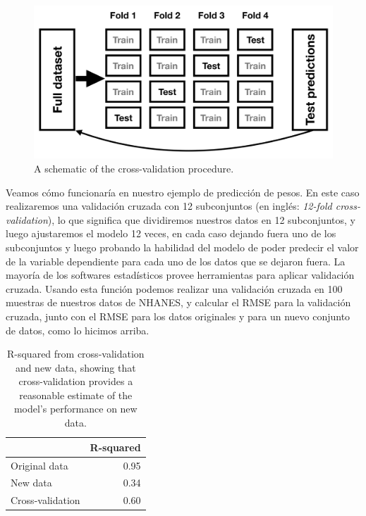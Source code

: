 \documentclass[
  12pt,
]{book}
\theoremstyle{definition}
\theoremstyle{definition}
\theoremstyle{definition}
\theoremstyle{remark}
\begin{document}
\begin{figure}
\includegraphics[width=45.74in,height=0.3\textheight]{images/crossvalidation} \caption{A schematic of the  cross-validation procedure.}\label{fig:crossvalidation}
\end{figure}

Veamos cómo funcionaría en nuestro ejemplo de predicción de pesos. En este caso realizaremos una validación cruzada con 12 subconjuntos (en inglés: \emph{12-fold cross-validation}), lo que significa que dividiremos nuestros datos en 12 subconjuntos, y luego ajustaremos el modelo 12 veces, en cada caso dejando fuera uno de los subconjuntos y luego probando la habilidad del modelo de poder predecir el valor de la variable dependiente para cada uno de los datos que se dejaron fuera. La mayoría de los softwares estadísticos provee herramientas para aplicar validación cruzada. Usando esta función podemos realizar una validación cruzada en 100 muestras de nuestros datos de NHANES, y calcular el RMSE para la validación cruzada, junto con el RMSE para los datos originales y para un nuevo conjunto de datos, como lo hicimos arriba.

\begin{table}

\caption{\label{tab:unnamed-chunk-106}R-squared from cross-validation and new data, showing that cross-validation provides a reasonable estimate of the model's performance on new data.}
\centering
\begin{tabular}[t]{l|r}
\hline
  & R-squared\\
\hline
Original data & 0.95\\
\hline
New data & 0.34\\
\hline
Cross-validation & 0.60\\
\hline
\end{tabular}
\end{table}
\end{document}
